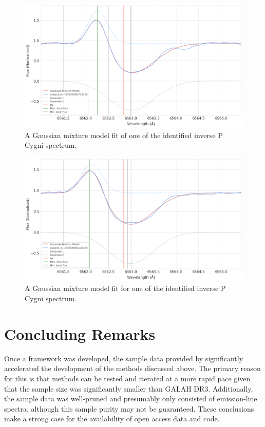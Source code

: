 \begin{figure}[!htb]
\centering
\includegraphics[scale=0.45]{figures/inverse p cygni 1.png}
\caption{A Gaussian mixture model fit of one of the identified inverse P Cygni spectrum. }
\end{figure}

\begin{figure}[!htb]
\centering
\includegraphics[scale=0.45]{figures/inverse p cygni fitted 2.png}
\caption{A Gaussian mixture model fit for one of the identified inverse P Cygni spectrum.}
\end{figure}

\section{Concluding Remarks}

Once a framework was developed, the sample data provided by \citet{vcotar2021galah} significantly accelerated the development of the methods discussed above. The primary reason for this is that methods can be tested and iterated at a more rapid pace given that the sample size was significantly smaller than GALAH DR3. Additionally, the sample data was well-pruned and presumably only consisted of emission-line spectra, although this sample purity may not be guaranteed. These conclusions make a strong case for the availability of open access data and code.

